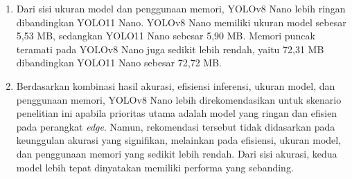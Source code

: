 \begin{sectioncontent}
\begin{enumerate}[leftmargin=0.75cm,label=\arabic*.]
        \item Dari sisi ukuran model dan penggunaan memori, YOLOv8 Nano lebih ringan dibandingkan YOLO11 Nano. YOLOv8 Nano memiliki ukuran model sebesar 5,53 MB, sedangkan YOLO11 Nano sebesar 5,90 MB. Memori puncak teramati pada YOLOv8 Nano juga sedikit lebih rendah, yaitu 72,31 MB dibandingkan YOLO11 Nano sebesar 72,72 MB.

        \item Berdasarkan kombinasi hasil akurasi, efisiensi inferensi, ukuran model, dan penggunaan memori, YOLOv8 Nano lebih direkomendasikan untuk skenario penelitian ini apabila prioritas utama adalah model yang ringan dan efisien pada perangkat \textit{edge}. Namun, rekomendasi tersebut tidak didasarkan pada keunggulan akurasi yang signifikan, melainkan pada efisiensi, ukuran model, dan penggunaan memori yang sedikit lebih rendah. Dari sisi akurasi, kedua model lebih tepat dinyatakan memiliki performa yang sebanding.
    \end{enumerate}
\end{sectioncontent}

